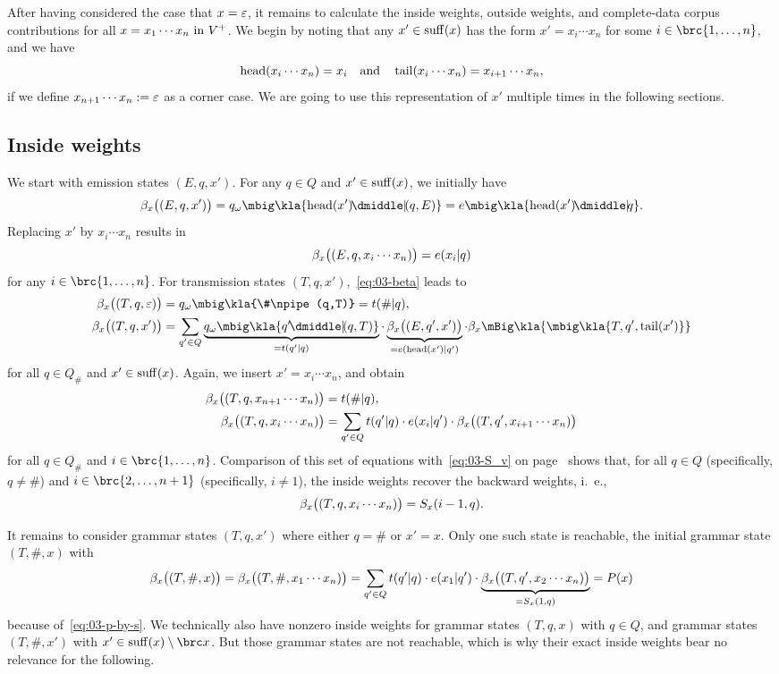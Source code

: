 After having considered the case that $x=\varepsilon$, it remains to calculate the
inside weights, outside weights, and complete-data corpus contributions for
all $x=x_1\cdots x_n\text{ in } V^+$. We begin by noting that any $x'\in\operatorname{suff}(x)$ has the form
$x' = x_i\cdots x_n$ for some $i\in\brc{1,\ldots,n}$, and we have
\[
 \operatorname{head}(x_i\cdots x_n) = x_i
 \quad\text{and}\quad
 \operatorname{tail}(x_i\cdots x_n) = x_{i+1} \cdots x_n,
\]
if we define $x_{n+1}\cdots x_n := \varepsilon$ as a corner case. We are going to use
this representation of $x'$ multiple times in the following sections.

\subsection{Inside weights}

We start with emission states $(E,q,x')$. For any $q\in Q$ and $x'\in\operatorname{suff}(x)$, we initially have
\[
 \beta_x\doublekla{E,q,x'} = q_\omega\mbig\kla{\car(x')\npipe(q,E)} = e\mbig\kla{\car(x')\npipe q}.
\]
Replacing $x'$ by $x_i\cdots x_n$ results in
\[
 \beta_x\bigl((E,q,x_i\cdots x_n)\bigr) = e(x_i|q)
\]
for any $i\in\brc{1,\ldots,n}$. For transmission states $(T,q,x')$,~\eqref{eq:03-beta} leads to
\begin{align*}
 \beta_x\doublekla{T,q,\eps} &= q_\omega\mbig\kla{\#\npipe(q,T)} = t(\#|q), \\
 \beta_x\doublekla{T,q,x'} &= \sum_{q'\in Q} \underbrace{q_\omega\mbig\kla{q'\npipe(q,T)}}_{=t(q'|q)} \cdot \underbrace{\beta_x\doublekla{E,q',x'}}_{=e(\car(x')|q')} \cdot \beta_x\mBig\kla{\mbig\kla{T,q',\cdr(x')}}
\end{align*}
for all $q\in Q_\#$ and $x'\in\operatorname{suff}(x)$. Again, we insert $x' = x_i\cdots x_n$, and obtain
\begin{align*}
 \beta_x\bigl((T,q,x_{n+1}\cdots x_n)\bigr) &= t(\#|q), \\
 \beta_x\bigl((T,q,x_i\cdots x_n)\bigr) &= \sum_{q'\in Q} t(q'|q) \cdot e(x_i|q') \cdot \beta_x\bigl((T,q',x_{i+1}\cdots x_n)\bigr)
\end{align*}
for all $q\in Q_\#$ and $i\in\brc{1,\ldots,n}$. Comparison of this set of
equations with~\eqref{eq:03-S_v} on page~\pageref{eq:03-S_v} shows that, for
all $q\in Q$ (specifically, $q\neq\#$) and $i\in\brc{2,\ldots,n+1}$
(specifically, $i\neq1$), the inside weights recover the backward weights,
i.~e.,
\[
 \beta_x\bigl((T,q,x_i\cdots x_n)\bigr) = S_x(i-1,q).
\]

It remains to consider grammar states $(T,q,x')$ where either $q=\#$ or $x'=x$. Only one
such state is reachable, the initial grammar state $(T,\#,x)$ with
\[
 \beta_x\bigl((T,\#,x)\bigr) = \beta_x\bigl((T,\#,x_1\cdots x_n)\bigr) = \sum_{q'\in Q} t(q'|q) \cdot e(x_1|q') \cdot \underbrace{\beta_x\bigl((T,q',x_2\cdots x_n)\bigr)}_{=S_x(1,q)} = P(x)
\]
because of~\eqref{eq:03-p-by-s}. We technically also have nonzero inside
weights for grammar states $(T,q,x)$ with $q\in Q$, and grammar states
$(T,\#,x')$ with $x'\in\suff(x)\setminus\brc x$. But those grammar states are
not reachable, which is why their exact inside weights bear no relevance for
the following.

